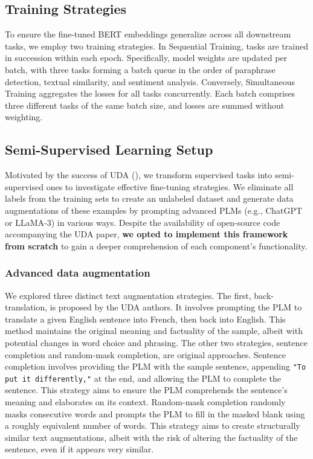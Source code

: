 \documentclass{article}
\begin{document}
\subsection{Training Strategies}
To ensure the fine-tuned BERT embeddings generalize across all downstream tasks, we 
employ two training strategies. In Sequential Training, tasks are trained in succession 
within each epoch. Specifically, model weights are updated per batch, with three tasks 
forming a batch queue in the order of paraphrase detection, textual similarity, and 
sentiment analysis.
Conversely, Simultaneous Training aggregates the losses for all tasks concurrently. 
Each batch comprises three different tasks of the same batch size, and losses are 
summed without weighting.

\subsection{Semi-Supervised Learning Setup}
Motivated by the success of UDA (\cite{xie2020unsupervised}), we transform supervised tasks 
into semi-supervised ones to investigate effective fine-tuning strategies. 
We eliminate all labels from the training sets to create an unlabeled dataset and 
generate data augmentations of these examples by prompting advanced PLMs (e.g., ChatGPT or 
LLaMA-3) in various ways.
Despite the availability of open-source code accompanying the UDA paper, \textbf{we opted 
to implement this framework from scratch} to gain a deeper comprehension of each 
component's functionality.

\subsubsection{Advanced data augmentation}
\label{sec:appr_data_aug}
We explored three distinct text augmentation strategies. The first, back-translation, 
is proposed by the UDA authors. It involves prompting the PLM to translate a given 
English sentence into French, then back into English. This method maintains the 
original meaning and factuality of the sample, albeit with potential changes in 
word choice and phrasing.
The other two strategies, sentence completion and random-mask completion, are original 
approaches. Sentence completion involves providing the PLM with the sample sentence, 
appending \texttt{"To put it differently,"} at the end, and allowing the PLM to complete the 
sentence. This strategy aims to ensure the PLM comprehends the sentence's meaning and 
elaborates on its context.
Random-mask completion randomly masks consecutive words and prompts the PLM to fill 
in the masked blank using a roughly equivalent number of words. This strategy aims to 
create structurally similar text augmentations, albeit with the risk of altering the 
factuality of the sentence, even if it appears very similar.
\end{document}
